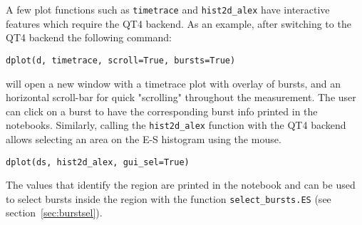 A few plot functions such as \verb|timetrace| and \verb|hist2d_alex| have interactive features 
which require the QT4 backend. As an example, after switching to the QT4 backend
the following command:

\begin{verbatim}
dplot(d, timetrace, scroll=True, bursts=True)
\end{verbatim}

\noindent
will open a new window with a timetrace plot with overlay of bursts, and an horizontal scroll-bar for quick
"scrolling" throughout the measurement. The user can click on a burst to have the corresponding burst info 
printed in the notebooks.
Similarly, calling the \verb|hist2d_alex| function with the QT4 backend allows
selecting an area on the E-S histogram using the mouse.

\begin{verbatim}
dplot(ds, hist2d_alex, gui_sel=True)
\end{verbatim}

The values that identify the region are printed in the notebook and can be used 
to select bursts inside the region with the function \verb|select_bursts.ES| (see
section~\ref{sec:burstsel}).
